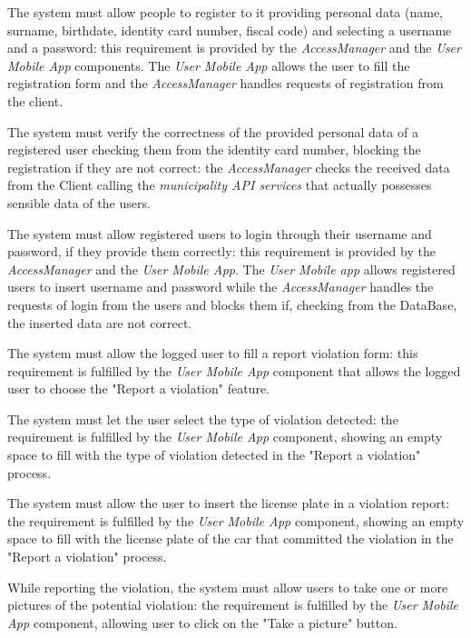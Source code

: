 \documentclass[a4paper]{report}
\begin{document}
\begin{enumerate}[start=1,label={[R\arabic*]}]
\item \label{[R1]} The system must allow people to register to it providing personal data (name, surname, birthdate, identity card number, fiscal code) and selecting a username and a password: this requirement is provided by the \textit{AccessManager} and the \textit{User Mobile App} components. The \textit{User Mobile App} allows the user to fill the registration form and the \textit{AccessManager} handles requests of registration from the client.
\item \label{[R2]} The system must verify the correctness of the provided personal data of a registered user checking them from the identity card number, blocking the registration if they are not correct: the \textit{AccessManager} checks the received data from the Client calling the \textit{municipality API services} that actually possesses sensible data of the users. 
\item  \label{[R3]}The system must allow registered users to login through their username and password, if they provide them correctly: this requirement is provided by the \textit{AccessManager} and the \textit{User Mobile App}. The \textit{User Mobile app} allows registered users to insert username and password while the \textit{AccessManager} handles the requests of login from the users and blocks them  if, checking from the DataBase, the inserted data are not correct. 
\item \label{[R4]} The system must allow the logged user to fill a report violation form: this requirement is fulfilled by the \textit{User Mobile App} component that allows the logged user to choose the "Report a violation" feature.
\item  \label{[R5]}The system must let the user select the type of violation detected: the requirement is fulfilled by the \textit{User Mobile App} component, showing an empty space to fill with the type of violation detected in the "Report a violation" process.
\item  \label{[R6]} The system must allow the user to insert the license plate in a violation report:  the requirement is fulfilled by the \textit{User Mobile App} component, showing an empty space to fill with the license plate of the car that committed the violation in the "Report a violation" process.
\item  \label{[R7]}While reporting the violation, the system must allow users to take one or more pictures of the potential violation: the requirement is fulfilled by the \textit{User Mobile App} component, allowing user to click on the "Take a picture" button.

\end{enumerate}
\end{document}
